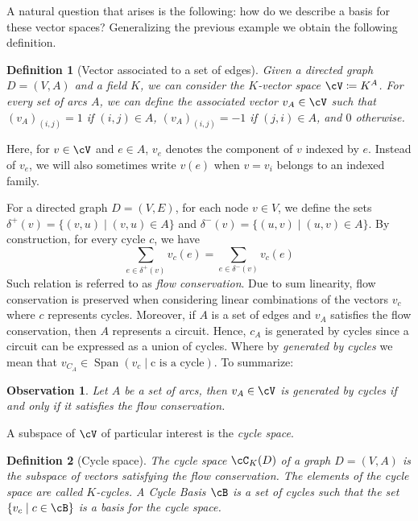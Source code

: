 \documentclass[11pt,a4paper,oneside,openany]{book}
\DeclareMathOperator{\SSpan}{Span}
\newtheorem{definition}{Definition}
\newtheorem{observation}[theorem]{Observation}
\numberwithin{definition}{section}
\numberwithin{theorem}{section}
\numberwithin{problem}{section}
\begin{document}
A natural question that arises is the following: how do we describe a basis for these vector spaces?
Generalizing the previous example we obtain the following definition.

\begin{definition}[Vector associated to a set of edges] \label{vector associated to a set of edges}
    Given a directed graph \(D=(V,A)\) and a field \(K\), we can consider the \(K\)-vector space \(\cV \coloneqq K^A\). For every set of arcs \(A\), we can define the associated vector \(v_A \in \cV\) such that \((v_A)_{(i,j)} = 1\) if \((i,j) \in A\), \((v_A)_{(i,j)} = -1\) if \((j,i) \in A\), and \(0\) otherwise.
\end{definition}

Here, for \(v \in \cV\) and \(e \in A\), \(v_e\) denotes the component of \(v\) indexed by \(e\). Instead of \(v_e\), we will also sometimes write \(v(e)\) when \(v = v_i\) belongs to an indexed family.

For a directed graph \(D=(V,E)\), for each node \(v \in V\), we define the sets \(\delta^+(v) = \{(v,u) \mid (v,u) \in A\}\) and  \(\delta^-(v) = \{(u,v) \mid (u,v) \in A\}\). By construction, for every cycle \(c\), we have 
\begin{equation}\label{flow conservation}
   \sum_{e \in \delta^+(v)}v_c(e) = \sum_{e \in \delta^-(v)}v_c(e)
\end{equation}
Such relation is referred to as \emph{flow conservation}. Due to sum linearity, flow conservation is preserved when considering linear combinations of the vectors \(v_c\) where \(c\) represents cycles. Moreover, if \(A\) is a set of edges and \(v_A\) satisfies the flow conservation, then \(A\) represents a circuit. Hence, \(c_A\) is generated by cycles since a circuit can be expressed as a union of cycles. Where by \emph{generated by cycles} we mean that $v_{C_A} \in \SSpan(v_c \mid \text{c is a cycle})$. To summarize:

\begin{observation} 
    Let $A$ be a set of arcs, then
    \(v_A \in \cV\) is generated by cycles if and only if it satisfies the flow conservation.
\end{observation}

 A subspace of \(\cV\) of particular interest is the \emph{cycle space}.

\begin{definition}[Cycle space]
    The \emph{cycle space} $\cC_K(D)$ of a graph \(D=(V,A)\) is the subspace of vectors satisfying the flow conservation. The elements of the cycle space are called $K$-\emph{cycles}. A \emph{Cycle Basis} \(\cB\) is a set of cycles such that the set \(\{v_c \mid c \in \cB \}\) is a basis for the cycle space.
\end{definition}
\end{document}
